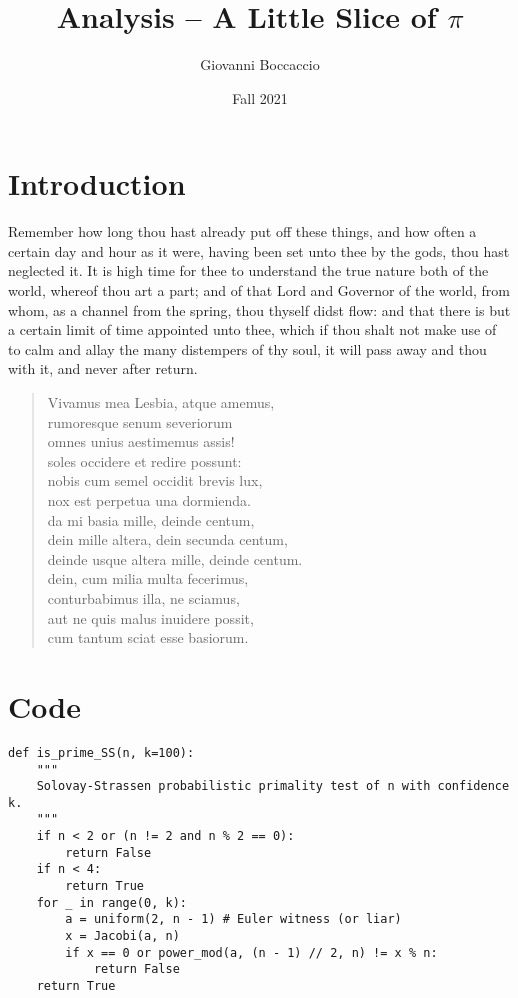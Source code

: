 \documentclass[12pt]{article}
\title{Analysis -- A Little Slice of $\pi$}
\author{Giovanni Boccaccio}
\date{Fall 2021}
\begin{document}
\maketitle

\section{Introduction}\label{intro}

Remember how long thou hast already put off these things, and how
often a certain day and hour as it were, having been set unto thee by
the gods, thou hast neglected it. It is high time for thee to understand
the true nature both of the world, whereof thou art a part; and of that
Lord and Governor of the world, from whom, as a channel from the spring,
thou thyself didst flow: and that there is but a certain limit of time
appointed unto thee, which if thou shalt not make use of to calm and
allay the many distempers of thy soul, it will pass away and thou with
it, and never after return.

\begin{quote}
Vivamus mea Lesbia, atque amemus, \\
rumoresque senum severiorum \\
omnes unius aestimemus assis! \\
soles occidere et redire possunt: \\
nobis cum semel occidit brevis lux, \\
nox est perpetua una dormienda. \\
da mi basia mille, deinde centum, \\
dein mille altera, dein secunda centum, \\
deinde usque altera mille, deinde centum. \\
dein, cum milia multa fecerimus, \\
conturbabimus illa, ne sciamus, \\
aut ne quis malus inuidere possit, \\
cum tantum sciat esse basiorum.
\end{quote}

\section{Code}\label{code}

\begin{verbatim}
def is_prime_SS(n, k=100):
    """
    Solovay-Strassen probabilistic primality test of n with confidence k.
    """
    if n < 2 or (n != 2 and n % 2 == 0):
        return False
    if n < 4:
        return True
    for _ in range(0, k):
        a = uniform(2, n - 1) # Euler witness (or liar)
        x = Jacobi(a, n)
        if x == 0 or power_mod(a, (n - 1) // 2, n) != x % n:
            return False
    return True
\end{verbatim}
\end{document}
